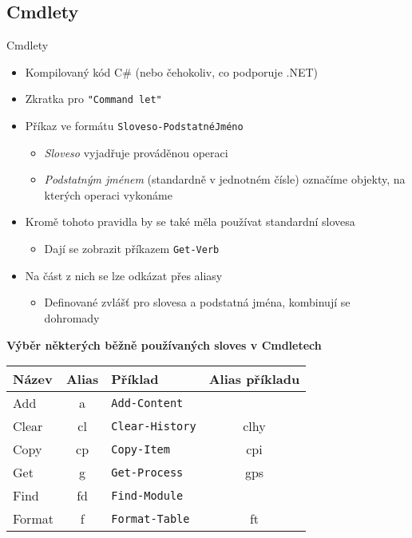 \documentclass[main.tex]{subfiles}
\begin{document}
\subsection{Cmdlety}
\begin{frame}[allowframebreaks]{Cmdlety}
  \begin{itemize}
    \item Kompilovaný kód C\# (nebo čehokoliv, co podporuje .NET)
    \item Zkratka pro \texttt{"Command let"}
    \item Příkaz ve formátu \texttt{Sloveso-PodstatnéJméno}
      \begin{itemize}
        \item \textit{Sloveso} vyjadřuje prováděnou operaci
        \item \textit{Podstatným jménem} (standardně v jednotném čísle) označíme objekty, na kterých operaci vykonáme
      \end{itemize}
   \item Kromě tohoto pravidla by se také měla používat standardní slovesa
     \begin{itemize}
       \item Dají se zobrazit příkazem \texttt{Get-Verb}
     \end{itemize}
  \item Na část z nich se lze odkázat přes aliasy
    \begin{itemize}
      \item Definované zvlášť pro slovesa a podstatná jména, kombinují se dohromady
    \end{itemize}
  \end{itemize}
  \framebreak
  \textbf{Výběr některých běžně používaných sloves v Cmdletech}
  \begin{center}
  \begin{tabular}{|l|c|l|c|}
    \hline
    \textbf{Název} & \textbf{Alias} & \textbf{Příklad} & \textbf{Alias příkladu} \\
    \hline
    Add & a & \texttt{Add-Content} & \\
    \hline
    Clear & cl & \texttt{Clear-History} & clhy \\
    \hline
    Copy & cp & \texttt{Copy-Item} & cpi \\
    \hline
    Get & g & \texttt{Get-Process} & gps \\
    \hline
    Find & fd & \texttt{Find-Module} & \\
    \hline
    Format & f & \texttt{Format-Table} & ft\\

\end{tabular}
\end{center}
\end{frame}
\end{document}
